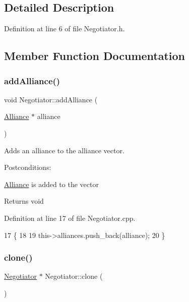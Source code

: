 \subsection{Detailed Description}


Definition at line 6 of file Negotiator.\+h.



\subsection{Member Function Documentation}
\mbox{\label{classNegotiator_ac8df6d3b6d75212252eecf1b50ecc8d4}} 
\subsubsection{\texorpdfstring{add\+Alliance()}{addAlliance()}}
{\footnotesize\ttfamily void Negotiator\+::add\+Alliance (\begin{DoxyParamCaption}\item[{\hyperlink{classAlliance}{Alliance} $\ast$}]{alliance }\end{DoxyParamCaption})}



Adds an alliance to the alliance vector. 

Postconditions\+:
\begin{DoxyItemize}
\item \hyperlink{classAlliance}{Alliance} is added to the vector
\end{DoxyItemize}

\begin{DoxyReturn}{Returns}
void 
\end{DoxyReturn}


Definition at line 17 of file Negotiator.\+cpp.


\begin{DoxyCode}
17                                                \{
18 
19     this->alliances.push\_back(alliance);
20 \}
\end{DoxyCode}
\mbox{\label{classNegotiator_adafefed500d3f36649696b3d2fc92be7}} 
\subsubsection{\texorpdfstring{clone()}{clone()}}
{\footnotesize\ttfamily \hyperlink{classNegotiator}{Negotiator} $\ast$ Negotiator\+::clone (\begin{DoxyParamCaption}{ }\end{DoxyParamCaption})}



